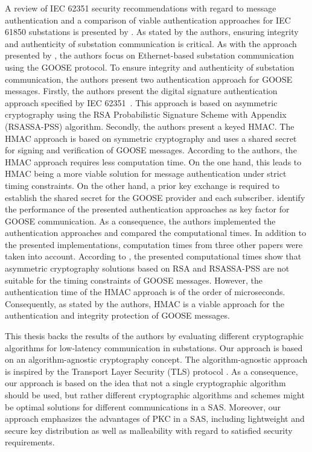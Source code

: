 A review of IEC 62351 security recommendations with regard to message authentication and a comparison of viable authentication approaches for IEC 61850 substations is presented by \citeauthor{Elbez2019} \cite{Elbez2019}.
As stated by the authors, ensuring integrity and authenticity of substation communication is critical.
As with the approach presented by \citeauthor{Ishchenko2018} \cite{Ishchenko2018}, the authors focus on Ethernet-based substation communication using the GOOSE protocol.
To ensure integrity and authenticity of substation communication, the authors present two authentication approach for GOOSE messages.
Firstly, the authors present the digital signature authentication approach specified by IEC 62351~\cite{IEC62351P6}.
This approach is based on asymmetric cryptography using the RSA Probabilistic Signature Scheme with Appendix (RSASSA-PSS) algorithm.
Secondly, the authors present a keyed HMAC.
The HMAC approach is based on symmetric cryptography and uses a shared secret for signing and verification of GOOSE messages.
According to the authors, the HMAC approach requires less computation time.
On the one hand, this leads to HMAC being a more viable solution for message authentication under strict timing constraints.
On the other hand, a prior key exchange is required to establish the shared secret for the GOOSE provider and each subscriber.
\citeauthor{Elbez2019} identify the performance of the presented authentication approaches as key factor for GOOSE communication.
As a consequence, the authors implemented the authentication approaches and compared the computational times.
In addition to the presented implementations, computation times from three other papers were taken into account.
According to \citeauthor{Elbez2019}, the presented computational times show that asymmetric cryptography solutions based on RSA and RSASSA-PSS are not suitable for the timing constraints of GOOSE messages.
However, the authentication time of the HMAC approach is of the order of microseconds.
Consequently, as stated by the authors, HMAC is a viable approach for the authentication and integrity protection of GOOSE messages.

This thesis backs the results of the authors by evaluating different cryptographic algorithms for low-latency communication in substations.
Our approach is based on an algorithm-agnostic cryptography concept.
The algorithm-agnostic approach is inspired by the Transport Layer Security (TLS) protocol \cite{rfc8446}.
As a consequence, our approach is based on the idea that not a single cryptographic algorithm should be used, but rather different cryptographic algorithms and schemes might be optimal solutions for different communications in a SAS.
Moreover, our approach emphasizes the advantages of PKC in a SAS, including lightweight and secure key distribution as well as malleability with regard to satisfied security requirements.

